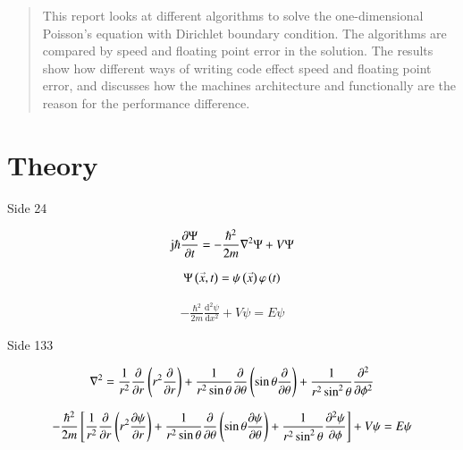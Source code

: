 \documentclass[11pt,english,a4paper]{article}
\begin{document}
\maketitle
\begin{flushleft}

\begin{abstract}
This report looks at different algorithms to solve the one-dimensional Poisson's equation with Dirichlet boundary condition. The algorithms are compared by speed and floating point error in the solution. The results show how different ways of writing code effect speed and floating point error, and discusses how the machines architecture and functionally are the reason for the performance difference.
\end{abstract}

\section{Theory}
Side 24

\begin{align*}
\im \hbar \frac{\partial \Psi}{\partial t} =- \frac{\hbar^2}{2m} \nabla^2 \Psi + V \Psi
\end{align*}

\begin{align*}
\Psi\left({\accentset{\rightarrow}{x},t}\right) = \psi\left({\accentset{\rightarrow}{x}}\right) \varphi\left({t}\right)
\end{align*}

\begin{align*}
-\frac{\hbar^2}{2m} \frac{\mathrm{d}^2 \psi}{\mathrm{d} x^2} + V \psi = E \psi
\end{align*}

Side 133

\begin{align*}
\nabla^2 = \frac{1}{r^2} \frac{\partial}{\partial r}\left({r^2 \frac{\partial }{\partial r}}\right) + \frac{1}{r^2 \sin \theta} \frac{\partial}{\partial \theta}\left({\sin \theta \frac{\partial }{\partial \theta}}\right) + \frac{1}{r^2 \sin^2 \theta} \frac{\partial^2}{\partial \phi^2}
\end{align*}

\begin{align*}
-\frac{\hbar^2}{2m}\left[{\frac{1}{r^2} \frac{\partial}{\partial r}\left({r^2 \frac{\partial \psi}{\partial r}}\right) + \frac{1}{r^2 \sin \theta} \frac{\partial}{\partial \theta}\left({\sin\theta \frac{\partial \psi}{\partial \theta}}\right) + \frac{1}{r^2 \sin^2 \theta} \frac{\partial^2 \psi}{\partial \phi}}\right] + V \psi = E \psi
\end{align*}


\end{flushleft}
\end{document}
